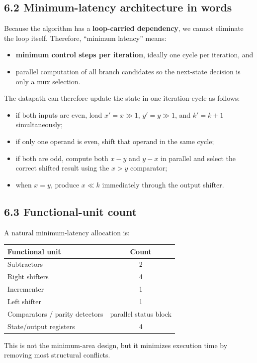 \documentclass[11pt,a4paper]{article}
\begin{document}
\subsection*{6.2 Minimum-latency architecture in words}
Because the algorithm has a \textbf{loop-carried dependency}, we cannot eliminate the loop itself. Therefore, ``minimum latency'' means:
\begin{itemize}
  \item \textbf{minimum control steps per iteration}, ideally one cycle per iteration, and
  \item parallel computation of all branch candidates so the next-state decision is only a mux selection.
\end{itemize}

The datapath can therefore update the state in one iteration-cycle as follows:
\begin{itemize}
  \item if both inputs are even, load $x' = x \gg 1$, $y' = y \gg 1$, and $k' = k+1$ simultaneously;
  \item if only one operand is even, shift that operand in the same cycle;
  \item if both are odd, compute both $x-y$ and $y-x$ in parallel and select the correct shifted result using the $x>y$ comparator;
  \item when $x=y$, produce $x \ll k$ immediately through the output shifter.
\end{itemize}

\subsection*{6.3 Functional-unit count}
A natural minimum-latency allocation is:
\begin{center}
\begin{tabular}{lc}
\toprule
Functional unit & Count \\
\midrule
Subtractors & 2 \\
Right shifters & 4 \\
Incrementer & 1 \\
Left shifter & 1 \\
Comparators / parity detectors & parallel status block \\
State/output registers & 4 \\
\bottomrule
\end{tabular}
\end{center}

\noindent
This is not the minimum-area design, but it minimizes execution time by removing most structural conflicts.
\end{document}

